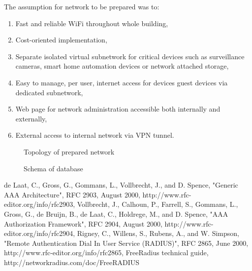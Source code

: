 \documentclass{llncs}
\begin{document}
The assumption for network to be prepared was to:
\begin{enumerate}
  \item Fast and reliable WiFi throughout whole building,
  \item Cost-oriented implementation,
  \item Separate isolated virtual subnetwork for critical devices
such as surveillance cameras, smart home automation devices or network attached
storage,
  \item Easy to manage, per user, internet access for devices guest devices via
  dedicated subnetwork,
  \item Web page for network administration accessible both internally and
  externally,
  \item External access to internal network via VPN tunnel.
\end{enumerate}


\begin{figure}
\vspace{-15pt}
\caption{Topology of prepared network}
\end{figure}

\begin{figure}
\vspace{-15pt}
\caption{Schema of database}
\end{figure}

%
%
\begin{thebibliography}{}
%
de Laat, C., Gross, G., Gommans, L., Vollbrecht, J., and D. Spence, "Generic AAA
Architecture", RFC 2903, August 2000, http://www.rfc-editor.org/info/rfc2903,
Vollbrecht, J., Calhoun, P., Farrell, S., Gommans, L., Gross, G., de Bruijn, B.,
de Laat, C., Holdrege, M., and D. Spence, "AAA Authorization Framework", RFC
2904, August 2000, http://www.rfc-editor.org/info/rfc2904,
Rigney, C., Willens, S., Rubens, A., and W. Simpson, "Remote  Authentication
Dial In User Service (RADIUS)", RFC 2865, June 2000,
http://www.rfc-editor.org/info/rfc2865,
FreeRadius technical guide,
http://networkradius.com/doc/FreeRADIUS%
\end{thebibliography}



\clearpage
{} %
\renewcommand{\indexname}{Author Index}
\printindex
\clearpage
{} %
\renewcommand{\indexname}{Subject Index}

\end{document}
